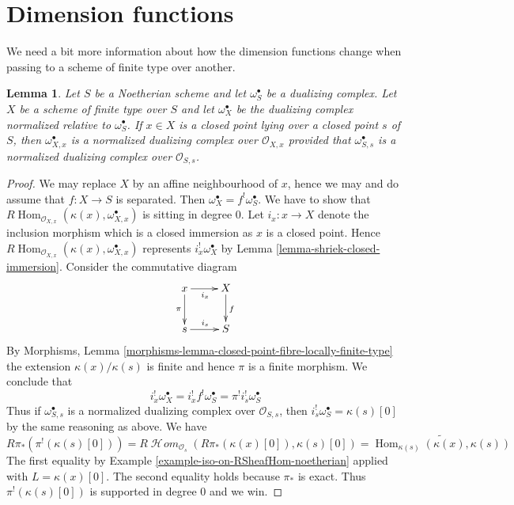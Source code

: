 \documentclass{stacks-project}
\theoremstyle{plain}
\newtheorem{lemma}[subsection]{Lemma}
\theoremstyle{definition}
\theoremstyle{remark}
\numberwithin{equation}{subsection}
\def\Hom{\mathop{\mathrm{Hom}}\nolimits}
\def\SheafHom{\mathop{\mathcal{H}\!\mathit{om}}\nolimits}
\begin{document}
\section{Dimension functions}
\label{section-dimension-functions}

\noindent
We need a bit more information about how the dimension functions change
when passing to a scheme of finite type over another.

\begin{lemma}
\label{lemma-good-dualizing-normalized}
Let $S$ be a Noetherian scheme and let $\omega_S^\bullet$ be a
dualizing complex. Let $X$ be a scheme of finite type over $S$ and let
$\omega_X^\bullet$ be the dualizing complex normalized relative
to $\omega_S^\bullet$. If $x \in X$ is a closed point lying over
a closed point $s$ of $S$, then $\omega_{X, x}^\bullet$
is a normalized dualizing complex over $\mathcal{O}_{X, x}$
provided that $\omega_{S, s}^\bullet$ is a normalized dualizing
complex over $\mathcal{O}_{S, s}$.
\end{lemma}

\begin{proof}
We may replace $X$ by an affine neighbourhood of $x$, hence we may
and do assume that $f : X \to S$ is separated.
Then $\omega_X^\bullet = f^!\omega_S^\bullet$. We have to show that
$R\Hom_{\mathcal{O}_{X, x}}(\kappa(x), \omega_{X, x}^\bullet)$
is sitting in degree $0$. Let $i_x : x \to X$ denote the inclusion
morphism which is a closed immersion as $x$ is a closed point.
Hence $R\Hom_{\mathcal{O}_{X, x}}(\kappa(x), \omega_{X, x}^\bullet)$
represents $i_x^!\omega_X^\bullet$ by
Lemma \ref{lemma-shriek-closed-immersion}.
Consider the commutative diagram
$$
\xymatrix{
x \ar[r]_{i_x} \ar[d]_\pi & X \ar[d]^f \\
s \ar[r]^{i_s} & S
}
$$
By Morphisms, Lemma
\ref{morphisms-lemma-closed-point-fibre-locally-finite-type}
the extension $\kappa(x)/\kappa(s)$ is finite and hence
$\pi$ is a finite morphism. We conclude that
$$
i_x^!\omega_X^\bullet = i_x^! f^! \omega_S^\bullet =
\pi^! i_s^! \omega_S^\bullet
$$
Thus if $\omega_{S, s}^\bullet$ is a normalized dualizing complex
over $\mathcal{O}_{S, s}$, then $i_s^!\omega_S^\bullet = \kappa(s)[0]$
by the same reasoning as above. We have
$$
R\pi_*(\pi^!(\kappa(s)[0])) =
R\SheafHom_{\mathcal{O}_s}(R\pi_*(\kappa(x)[0]), \kappa(s)[0]) =
\widetilde{\Hom_{\kappa(s)}(\kappa(x), \kappa(s))}
$$
The first equality by Example \ref{example-iso-on-RSheafHom-noetherian}
applied with $L = \kappa(x)[0]$. The second equality holds because
$\pi_*$ is exact.
Thus $\pi^!(\kappa(s)[0])$ is supported in degree $0$ and we win.
\end{proof}
\end{document}
